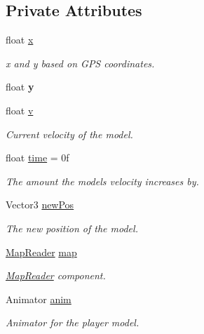 \subsection*{Private Attributes}
\begin{DoxyCompactItemize}
\item 
float \mbox{\hyperlink{class_model_controller_a04c854f156b7eafee7c558a5da07e7cb}{x}}
\begin{DoxyCompactList}\small\item\em x and y based on G\+PS coordinates. \end{DoxyCompactList}\item 
\mbox{\label{class_model_controller_ae20cb851b4ac28fd58d4316ca17e236d}} 
float {\bfseries y}
\item 
float \mbox{\hyperlink{class_model_controller_a8353ec90a68cf11775b83496a1030aea}{v}}
\begin{DoxyCompactList}\small\item\em Current velocity of the model. \end{DoxyCompactList}\item 
float \mbox{\hyperlink{class_model_controller_aa3c5bd10d5602786aac268381b727e02}{time}} = 0f
\begin{DoxyCompactList}\small\item\em The amount the models velocity increases by. \end{DoxyCompactList}\item 
Vector3 \mbox{\hyperlink{class_model_controller_ab566415f2c4e0984afc36f947cffc6de}{new\+Pos}}
\begin{DoxyCompactList}\small\item\em The new position of the model. \end{DoxyCompactList}\item 
\mbox{\hyperlink{class_map_reader}{Map\+Reader}} \mbox{\hyperlink{class_model_controller_ad1ec83914e19433c15f55c11e12c186d}{map}}
\begin{DoxyCompactList}\small\item\em \mbox{\hyperlink{class_map_reader}{Map\+Reader}} component. \end{DoxyCompactList}\item 
Animator \mbox{\hyperlink{class_model_controller_a620c1a841b10909184484bf44394486d}{anim}}
\begin{DoxyCompactList}\small\item\em Animator for the player model. \end{DoxyCompactList}\end{DoxyCompactItemize}


